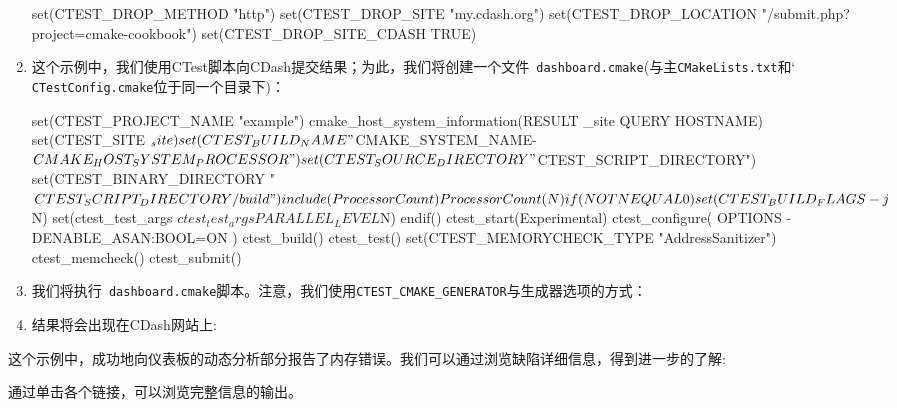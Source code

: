 \begin{enumerate}
\begin{codebox}[cmake]
set(CTEST_DROP_METHOD "http")
set(CTEST_DROP_SITE "my.cdash.org")
set(CTEST_DROP_LOCATION "/submit.php?project=cmake-cookbook")
set(CTEST_DROP_SITE_CDASH TRUE)
\end{codebox}

\item 这个示例中，我们使用CTest脚本向CDash提交结果；为此，我们将创建一个文件\texttt{ dashboard.cmake}(与主\texttt{CMakeLists.txt}和`\texttt{ CTestConfig.cmake}位于同一个目录下)：

\begin{codebox}[cmake]
set(CTEST_PROJECT_NAME "example")
cmake_host_system_information(RESULT _site QUERY HOSTNAME)
set(CTEST_SITE ${_site})
set(CTEST_BUILD_NAME "${CMAKE_SYSTEM_NAME}-${CMAKE_HOST_SYSTEM_PROCESSOR}")
set(CTEST_SOURCE_DIRECTORY "${CTEST_SCRIPT_DIRECTORY}")
set(CTEST_BINARY_DIRECTORY "${CTEST_SCRIPT_DIRECTORY}/build")
include(ProcessorCount)
ProcessorCount(N)
if(NOT N EQUAL 0)
  set(CTEST_BUILD_FLAGS -j${N})
  set(ctest_test_args ${ctest_test_args} PARALLEL_LEVEL ${N})
endif()
ctest_start(Experimental)
ctest_configure(
  OPTIONS
    -DENABLE_ASAN:BOOL=ON
  )
ctest_build()
ctest_test()
set(CTEST_MEMORYCHECK_TYPE "AddressSanitizer")
ctest_memcheck()
ctest_submit()
\end{codebox}

\item 我们将执行\texttt{ dashboard.cmake}脚本。注意，我们使用\texttt{CTEST\_CMAKE\_GENERATOR}与生成器选项的方式：


\item 结果将会出现在CDash网站上:


\end{enumerate}


这个示例中，成功地向仪表板的动态分析部分报告了内存错误。我们可以通过浏览缺陷详细信息，得到进一步的了解:


通过单击各个链接，可以浏览完整信息的输出。

